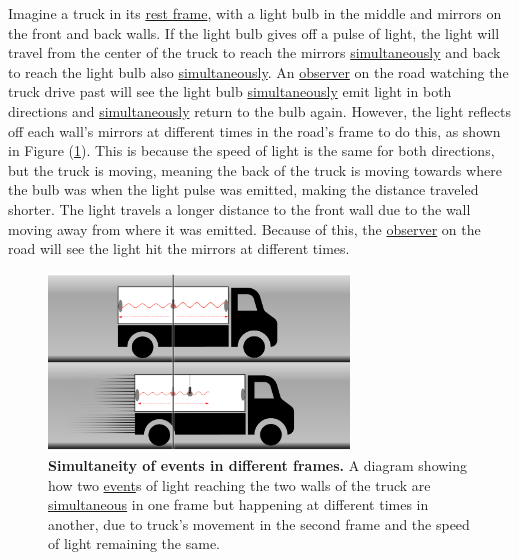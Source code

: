 Imagine a truck in its \hyperlink{def-proper-frame}{rest frame}, with a light bulb in the middle and mirrors on the front and back walls.
If the light bulb gives off a pulse of light, the light will travel from the center of the truck to reach the mirrors \hyperlink{def-simultaneity}{simultaneously} and back to reach the light bulb also \hyperlink{def-simultaneity}{simultaneously}.
An \hyperlink{def-observer}{observer} on the road watching the truck drive past will see the light bulb \hyperlink{def-simultaneity}{simultaneously} emit light in both directions and \hyperlink{def-simultaneity}{simultaneously} return to the bulb again.
However, the light reflects off each wall's mirrors at different times in the road's frame to do this, as shown in Figure (\ref{fig: truck simultaneity}).
This is because the speed of light is the same for both directions, but the truck is moving, meaning the back of the truck is moving towards where the bulb was when the light pulse was emitted, making the distance traveled shorter.
The light travels a longer distance to the front wall due to the wall moving away from where it was emitted.
Because of this, the \hyperlink{def-observer}{observer} on the road will see the light hit the mirrors at different times.

\begin{figure}[htbp]
	\centering
	\includegraphics[width = 8cm]{images/pdf/lorry_simul.pdf}
	\caption{\textbf{Simultaneity of events in different frames.} A diagram showing how two \protect\hyperlink{def-event}{event}s of light reaching the two walls of the truck are \protect\hyperlink{def-simultaneity}{simultaneous} in one frame but happening at different times in another, due to truck's movement in the second frame and the speed of light remaining the same.}
	\label{fig: truck simultaneity}
\end{figure}

%

